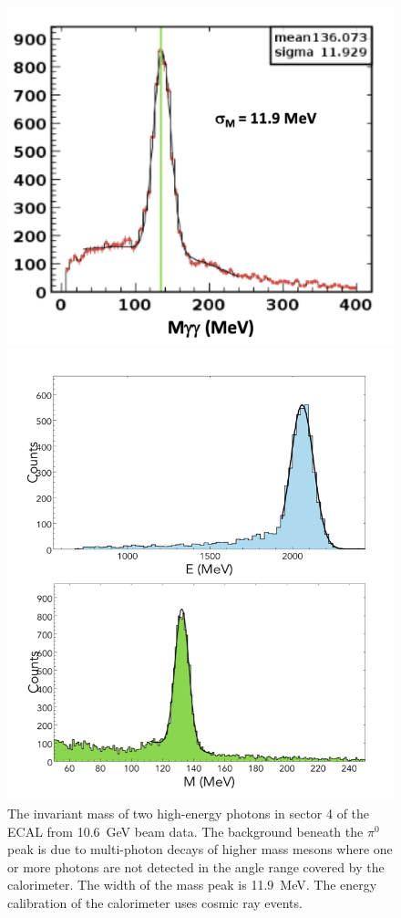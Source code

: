\documentclass[final,3p,twocolumn]{elsarticle}
\begin{document}
\begin{figure}[tp!]
\centerline{\includegraphics[width=0.95\columnwidth]{ECAL-2g-mass-fit.png}}
\caption{The invariant mass of two high-energy photons in sector 4 of the ECAL from 10.6~GeV beam data. The
  background beneath the $\pi^0$ peak is due to multi-photon decays of higher mass mesons where one or more
  photons are not detected in the angle range covered by the calorimeter. The width of the mass peak is 11.9~MeV.
  The energy calibration of the calorimeter uses cosmic ray events.}
\label{gg-ecal}
\centerline{\includegraphics[width=1.15\columnwidth]{FT-performance.png}}

\end{figure}
\end{document}
